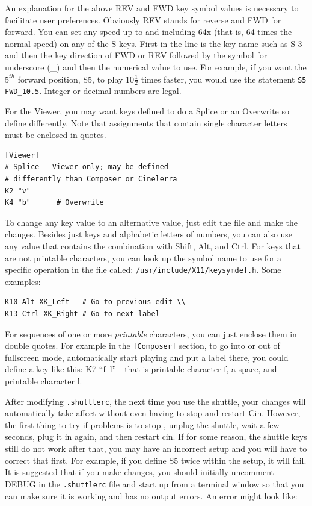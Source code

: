An explanation for the above REV and FWD key symbol values is
necessary to facilitate user preferences.  Obviously REV stands for
reverse and FWD for forward.  You can set any speed up to and
including 64x (that is, 64 times the normal speed) on any of the S
keys.  First in the line is the key name such as S-3 and then the
key direction of FWD or REV followed by the symbol for underscore
(\_) and then the numerical value to use.  For example, if you want
the $5^{th}$ forward position, S5, to play 10$\frac{1}{2}$ times
faster, you would use the statement \texttt{S5 FWD\_10.5}.  Integer
or decimal numbers are legal.

For the Viewer, you may want keys defined to do a Splice or an
Overwrite so define differently.  Note that assignments that contain
single character letters must be enclosed in quotes.

\begin{lstlisting}[style=sh]
[Viewer]
# Splice - Viewer only; may be defined
# differently than Composer or Cinelerra
K2 "v"
K4 "b"		# Overwrite
\end{lstlisting}

To change any key value to an alternative value, just edit the file
and make the changes.  Besides just keys and alphabetic letters of
numbers, you can also use any \CGG{} value that contains the
combination with Shift, Alt, and Ctrl.  For keys that are not
printable characters, you can look up the symbol name to use for a
specific operation in the file called:
\texttt{/usr/include/X11/keysymdef.h}. Some examples:

\begin{lstlisting}[style=sh]
K10 Alt-XK_Left	  # Go to previous edit \\
K13 Ctrl-XK_Right # Go to next label
\end{lstlisting}

For sequences of one or more \textit{printable} characters, you can
just enclose them in double quotes.  For example in the
\texttt{[Composer]} section, to go into or out of fullscreen mode,
automatically start playing and put a label there, you could define
a key like this:  K7 “f~l” - that is printable character f, a space,
and printable character l.

After modifying \texttt{.shuttlerc}, the next time you use the
shuttle, your changes will automatically take affect without even
having to stop and restart Cin.  However, the first thing to try if
problems is to stop \CGG{}, unplug the shuttle, wait a few seconds,
plug it in again, and then restart cin.  If for some reason, the
shuttle keys still do not work after that, you may have an incorrect
setup and you will have to correct that first.  For example, if you
define S5 twice within the \CGG{} setup, it will fail.  It is
suggested that if you make changes, you should initially uncomment
DEBUG in the \texttt{.shuttlerc} file and start up \CGG{} from a
terminal window so that you can make sure it is working and has no
output errors.  An error might look like:


